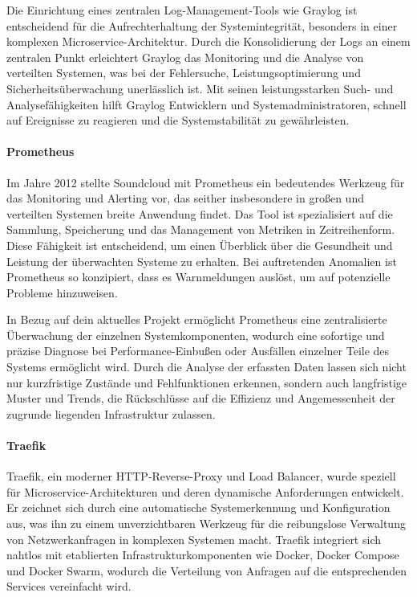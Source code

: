 Die Einrichtung eines zentralen Log-Management-Tools wie Graylog ist entscheidend für die Aufrechterhaltung der Systemintegrität, besonders in einer 
komplexen Microservice-Architektur. Durch die Konsolidierung der Logs an einem zentralen Punkt erleichtert Graylog das Monitoring und die Analyse von 
verteilten Systemen, was bei der Fehlersuche, Leistungsoptimierung und Sicherheitsüberwachung unerlässlich ist. Mit seinen leistungsstarken Such- und Analysefähigkeiten 
hilft Graylog Entwicklern und Systemadministratoren, schnell auf Ereignisse zu reagieren und die Systemstabilität zu gewährleisten.


\paragraph{Prometheus}
Im Jahre 2012 stellte Soundcloud mit Prometheus ein bedeutendes Werkzeug für das Monitoring und Alerting vor, das seither insbesondere in großen und verteilten 
Systemen breite Anwendung findet. Das Tool ist spezialisiert auf die Sammlung, Speicherung und das Management von Metriken in Zeitreihenform. 
Diese Fähigkeit ist entscheidend, um einen Überblick über die Gesundheit und Leistung der überwachten Systeme zu erhalten. 
Bei auftretenden Anomalien ist Prometheus so konzipiert, dass es Warnmeldungen auslöst, um auf potenzielle Probleme hinzuweisen\cite*{Overview70:online}.

In Bezug auf dein aktuelles Projekt ermöglicht Prometheus eine zentralisierte Überwachung der einzelnen Systemkomponenten, wodurch eine sofortige und präzise 
Diagnose bei Performance-Einbußen oder Ausfällen einzelner Teile des Systems ermöglicht wird. Durch die Analyse der erfassten Daten lassen sich nicht nur kurzfristige 
Zustände und Fehlfunktionen erkennen, sondern auch langfristige Muster und Trends, die Rückschlüsse auf die Effizienz und Angemessenheit der zugrunde liegenden 
Infrastruktur zulassen.




\paragraph{Traefik}
Traefik, ein moderner HTTP-Reverse-Proxy und Load Balancer, wurde speziell für Microservice-Architekturen und deren dynamische Anforderungen entwickelt. 
Er zeichnet sich durch eine automatische Systemerkennung und Konfiguration aus, was ihn zu einem unverzichtbaren Werkzeug für die reibungslose Verwaltung von 
Netzwerkanfragen in komplexen Systemen macht. Traefik integriert sich nahtlos mit etablierten Infrastrukturkomponenten wie Docker, Docker Compose und Docker Swarm, 
wodurch die Verteilung von Anfragen auf die entsprechenden Services vereinfacht wird.

